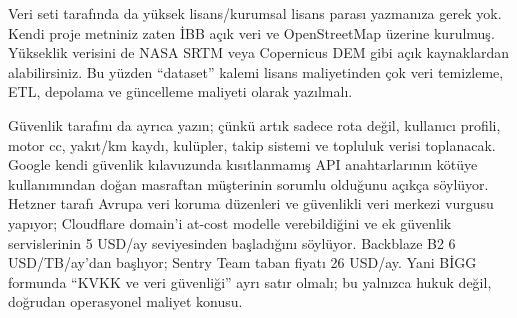 \documentclass[varwidth=18cm, border=1cm]{standalone}
\begin{document}
Veri seti tarafında da yüksek lisans/kurumsal lisans parası yazmanıza gerek yok. Kendi proje metniniz zaten İBB açık veri ve OpenStreetMap üzerine kurulmuş. Yükseklik verisini de NASA SRTM veya Copernicus DEM gibi açık kaynaklardan alabilirsiniz. Bu yüzden “dataset” kalemi lisans maliyetinden çok veri temizleme, ETL, depolama ve güncelleme maliyeti olarak yazılmalı.

Güvenlik tarafını da ayrıca yazın; çünkü artık sadece rota değil, kullanıcı profili, motor cc, yakıt/km kaydı, kulüpler, takip sistemi ve topluluk verisi toplanacak. Google kendi güvenlik kılavuzunda kısıtlanmamış API anahtarlarının kötüye kullanımından doğan masraftan müşterinin sorumlu olduğunu açıkça söylüyor. Hetzner tarafı Avrupa veri koruma düzenleri ve güvenlikli veri merkezi vurgusu yapıyor; Cloudflare domain’i at-cost modelle verebildiğini ve ek güvenlik servislerinin 5 USD/ay seviyesinden başladığını söylüyor. Backblaze B2 6 USD/TB/ay’dan başlıyor; Sentry Team taban fiyatı 26 USD/ay. Yani BİGG formunda “KVKK ve veri güvenliği” ayrı satır olmalı; bu yalnızca hukuk değil, doğrudan operasyonel maliyet konusu.

\vspace{0.5cm}
\end{document}
